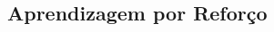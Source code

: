 \documentclass[12pt,a4paper]{article}
\begin{document}
\begin{multicols}{2}
	\section{Aprendizagem por Reforço}

	\end{multicols}
\end{document}
